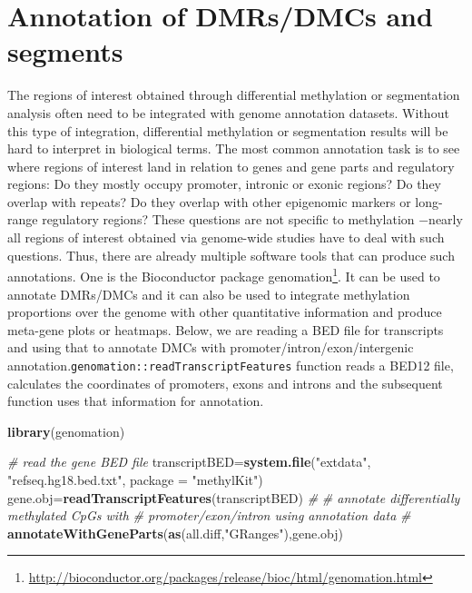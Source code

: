 \documentclass[12pt,]{krantz}
\newenvironment{Shaded}{\begin{snugshade}}{\end{snugshade}}
\newcommand{\CommentTok}[1]{\textcolor[rgb]{0.56,0.35,0.01}{\textit{#1}}}
\newcommand{\DataTypeTok}[1]{\textcolor[rgb]{0.13,0.29,0.53}{#1}}
\newcommand{\KeywordTok}[1]{\textcolor[rgb]{0.13,0.29,0.53}{\textbf{#1}}}
\newcommand{\NormalTok}[1]{#1}
\newcommand{\StringTok}[1]{\textcolor[rgb]{0.31,0.60,0.02}{#1}}
\renewcommand{\href}[2]{#2\footnote{\url{#1}}}
\begin{document}
\hypertarget{annotation-of-dmrsdmcs-and-segments}{%
\section{Annotation of DMRs/DMCs and segments}\label{annotation-of-dmrsdmcs-and-segments}}

The regions of interest obtained through differential methylation or segmentation analysis often need to be integrated with genome annotation datasets. Without this type of integration, differential methylation or segmentation results will be hard to interpret in biological terms. The most common annotation task is to see where regions of interest land in relation to genes and gene parts and regulatory regions: Do they mostly occupy promoter, intronic or exonic regions? Do they overlap with repeats? Do they overlap with other epigenomic markers or long-range regulatory regions? These questions are not specific to methylation −nearly all regions of interest obtained via genome-wide studies have to deal with such questions. Thus, there are already multiple software tools that can produce such annotations. One is the Bioconductor package \href{http://bioconductor.org/packages/release/bioc/html/genomation.html}{genomation}\citep{Akalin2015-yk}. It can be used to annotate DMRs/DMCs and it can also be used to integrate methylation proportions over the genome with other quantitative information and produce meta-gene plots or heatmaps. Below, we are reading a BED file for transcripts and using that to annotate DMCs with promoter/intron/exon/intergenic annotation.\texttt{genomation::readTranscriptFeatures} function reads a BED12 file, calculates the coordinates of promoters, exons and introns and the subsequent function uses that information for annotation.

\begin{Shaded}
\begin{Highlighting}[]
\KeywordTok{library}\NormalTok{(genomation)}

\CommentTok{# read the gene BED file}
\NormalTok{transcriptBED=}\KeywordTok{system.file}\NormalTok{(}\StringTok{"extdata"}\NormalTok{, }\StringTok{"refseq.hg18.bed.txt"}\NormalTok{, }
                                           \DataTypeTok{package =} \StringTok{"methylKit"}\NormalTok{)}
\NormalTok{gene.obj=}\KeywordTok{readTranscriptFeatures}\NormalTok{(transcriptBED)}
\CommentTok{#}
\CommentTok{# annotate differentially methylated CpGs with }
\CommentTok{# promoter/exon/intron using annotation data}
\CommentTok{#}
\KeywordTok{annotateWithGeneParts}\NormalTok{(}\KeywordTok{as}\NormalTok{(all.diff,}\StringTok{"GRanges"}\NormalTok{),gene.obj)}
\end{Highlighting}
\end{Shaded}
\end{document}
